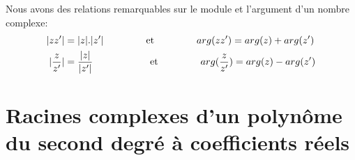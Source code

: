 \documentclass[12pt,a4paper,openany]{book}
\begin{document}
Nous avons des relations remarquables sur le module et l'argument d'un nombre complexe:
\begin{align}
|zz'| & = |z|.|z'| \text{\hspace{40px} et \hspace{40px}} arg(zz') = arg(z) + arg(z')\\
|\dfrac{z}{z'}| & = \dfrac{|z|}{|z'|} \text{\hspace{55px} et \hspace{40px}} arg(\dfrac{z}{z'}) = arg(z) - arg(z')
\end{align}

\section{Racines complexes d'un polynôme du second degré à coefficients réels}
\end{document}
